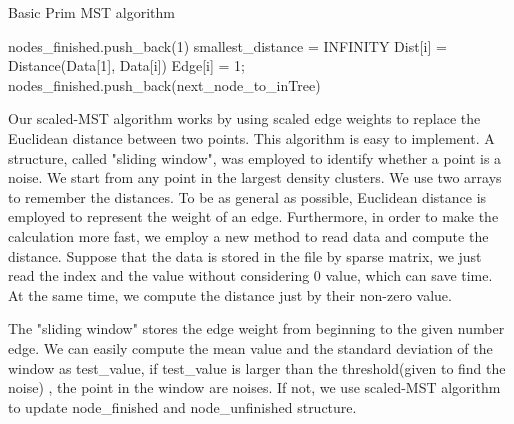 	  \begin{algorithm}
		\caption{Basic Prim MST algorithm}  
		nodes\_finished.push\_back(1)\;
		smallest\_distance = INFINITY\;
		 {
		  Dist[i] = Distance(Data[1], Data[i])\;
		  Edge[i] = 1;
		}
		nodes\_finished.push\_back(next\_node\_to\_inTree)\;
		 {
		}
	  \end{algorithm}  

	  Our scaled-MST algorithm works by using scaled edge weights to replace the Euclidean distance between two points. This algorithm is easy to implement. A structure, called "sliding window", was employed to identify whether a point is a noise. We start from any point in the largest density clusters. We use two arrays to remember the distances. To be as general as possible, Euclidean distance is employed to represent the weight of an edge. Furthermore, in order to make the calculation more fast, we employ a new method to read data and compute the distance. Suppose that the data is stored in the file by sparse matrix, we just read the index and the value without considering 0 value, which can save time. At the same time, we compute the distance just by their non-zero value. 

	  The "sliding window" stores the edge weight from beginning to the given number edge. We can easily compute the mean value and the standard deviation of the window as test\_value, if test\_value is larger than the threshold(given to find the noise) , the point in the window are noises. If not, we use scaled-MST algorithm to update node\_finished and node\_unfinished structure. 

